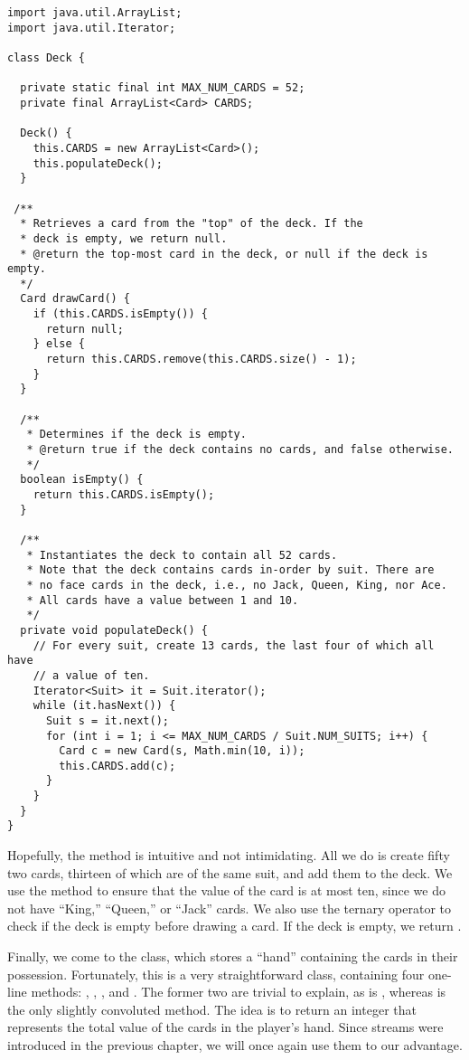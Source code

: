 \enlargethispage{-5\baselineskip}
\begin{lstlisting}[language=MyJava]
import java.util.ArrayList;
import java.util.Iterator;

class Deck {

  private static final int MAX_NUM_CARDS = 52;
  private final ArrayList<Card> CARDS;

  Deck() {
    this.CARDS = new ArrayList<Card>();
    this.populateDeck();
  }

 /**
  * Retrieves a card from the "top" of the deck. If the
  * deck is empty, we return null.
  * @return the top-most card in the deck, or null if the deck is empty.
  */
  Card drawCard() {
    if (this.CARDS.isEmpty()) {
      return null;
    } else {
      return this.CARDS.remove(this.CARDS.size() - 1);
    }
  }

  /**
   * Determines if the deck is empty.
   * @return true if the deck contains no cards, and false otherwise.
   */
  boolean isEmpty() { 
    return this.CARDS.isEmpty(); 
  }

  /**
   * Instantiates the deck to contain all 52 cards.
   * Note that the deck contains cards in-order by suit. There are 
   * no face cards in the deck, i.e., no Jack, Queen, King, nor Ace.
   * All cards have a value between 1 and 10.
   */
  private void populateDeck() {
    // For every suit, create 13 cards, the last four of which all have
    // a value of ten.
    Iterator<Suit> it = Suit.iterator();
    while (it.hasNext()) {
      Suit s = it.next();
      for (int i = 1; i <= MAX_NUM_CARDS / Suit.NUM_SUITS; i++) {
        Card c = new Card(s, Math.min(10, i));
        this.CARDS.add(c);
      }
    }
  }
}
\end{lstlisting}

\newpage %
Hopefully, the  method is intuitive and not intimidating. 
All we do is create fifty two cards, thirteen of which are of the same suit, and add them to the deck.
We use the  method to ensure that the value of the card is at most ten, since we do not have ``King,'' ``Queen,'' or ``Jack'' cards. 
We also use the ternary operator to check if the deck is empty before drawing a card. 
If the deck is empty, we return .

Finally, we come to the  class, which stores a ``hand'' containing the cards in their possession. 
Fortunately, this is a very straightforward class, containing four one-line methods: , , , and . 
The former two are trivial to explain, as is , whereas  is the only slightly convoluted method. 
The idea is to return an integer that represents the total value of the cards in the player's hand. 
Since streams were introduced in the previous chapter, we will once again use them to our advantage.

